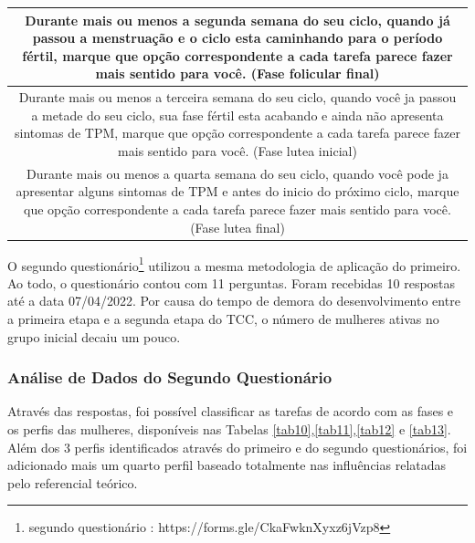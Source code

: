 \begin{table}[ht]
\begin{tabular}{c}
        \midrule
        \begin{minipage} [t] {1\textwidth} Durante mais ou menos a segunda semana do seu ciclo, quando já passou a menstruação e o ciclo esta caminhando para o período fértil, marque que opção correspondente a cada tarefa parece fazer mais sentido para você. (Fase folicular final)\end{minipage}\\
        \midrule
        \begin{minipage} [t] {1\textwidth} Durante mais ou menos a terceira semana do seu ciclo, quando você ja passou a metade do seu ciclo, sua fase fértil esta acabando e ainda não apresenta sintomas de TPM, marque que opção correspondente a cada tarefa parece fazer mais sentido para você. (Fase lutea inicial) \end{minipage}\\
        \midrule
        \begin{minipage} [t] {1\textwidth} Durante mais ou menos a quarta semana do seu ciclo, quando você pode ja apresentar alguns sintomas de TPM e antes do inicio do próximo ciclo, marque que opção correspondente a cada tarefa parece fazer mais sentido para você. (Fase lutea final) \end{minipage}\\
        \bottomrule
    \end{tabular}
\end{table}


O segundo questionário\footnote{segundo questionário : https://forms.gle/CkaFwknXyxz6jVzp8} 
utilizou a mesma metodologia de aplicação do primeiro.
Ao todo, o questionário contou com 11 perguntas. Foram recebidas 10 respostas até a 
data 07/04/2022. Por causa do tempo de demora do desenvolvimento 
entre a primeira etapa e a segunda etapa do TCC, o número de mulheres ativas no grupo 
inicial decaiu um pouco. 


\subsubsection{Análise de Dados do Segundo Questionário}
\label{vsf2}
Através das respostas, foi possível 
classificar as tarefas de acordo com as fases e os perfis das mulheres, disponíveis nas Tabelas \ref{tab10},\ref{tab11},\ref{tab12} e \ref{tab13}.
Além dos 3 perfis identificados através do primeiro e do segundo questionários, foi adicionado mais um quarto perfil 
baseado totalmente nas influências relatadas pelo referencial teórico. 

